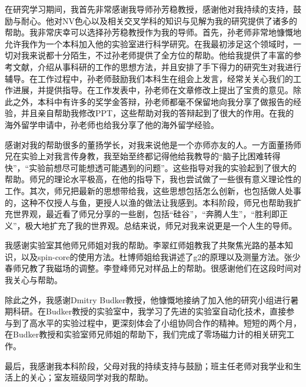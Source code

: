 
\begin{acknowledgements}

在研究学习期间，我首先非常感谢我导师孙芳稳教授，感谢他对我持续的支持，鼓励与耐心。他对NV色心以及相关交叉学科的知识与见解为我的研究提供了诸多的帮助。我非常庆幸可以选择孙芳稳教授作为我的导师。首先，孙老师非常地慷慨地允许我作为一个本科加入他的实验室进行科学研究。在我最初涉足这个领域时，一切对我来说都十分陌生，不过孙老师提供了全方位的帮助。他给我提供了丰富的参考文献，介绍从事科研的工作的思想方法，并且安排了手下得力的研究生对我进行辅导。在工作过程中，孙老师鼓励我们本科生在组会上发言，经常关关心我们的工作进展，并提供指导。在工作发表中，孙老师在文章修改上提出了宝贵的意见。除此之外，本科中有许多的奖学金答辩，孙老师都毫不保留地向我分享了做报告的经验，并且亲自帮助我修改PPT，这些帮助对我的答辩起到了很大的作用。在我的海外留学申请中，孙老师也给我分享了他的海外留学经验。

感谢对我的帮助很多的董扬学长，对我来说他是一个亦师亦友的人。一方面董扬师兄在实验上对我言传身教，我至始至终都记得他给我教导的“脑子比困难转得快”，“实验前想尽可能想透可能遇到的问题”。这些指导对我的实验起到了很大的帮助。师兄的理论水平极高，在他的指导下，我也尝试做了一些很有意义理论性的工作。其次，师兄把最新的思想带给我，这些思想包括怎么创新，也包括做人处事的，这种不仅授人与鱼，更授人以渔的做法让我感到。本科阶段，师兄也帮助我扩充世界观，最近看了师兄分享的一些剧，包括“硅谷”，“奔腾人生”，“胜利即正义”，极大地扩充了我的世界观。总结来说，师兄对我来说更是一个人生的导师。

我感谢实验室其他师兄师姐对我的帮助。李翠红师姐教我了共聚焦光路的基本知识，以及spin-core的使用方法。杜博师姐给我讲述了g2的原理以及测量方法。张少春师兄教了我磁场的调整。李登峰师兄对样品上的帮助。很感谢他们在这段时间对我关心与帮助。

除此之外，我感谢Dmitry Budker教授，他慷慨地接纳了加入他的研究小组进行暑期科研。在Budker教授的实验室中，我学习了先进的实验室自动化技术，直接参与到了高水平的实验过程中，更深刻体会了小组协同合作的精神。短短的两个月，在Budker教授和实验室师兄师姐的帮助下，我们完成了零场磁力计的相关研究工作。

最后，我感谢我本科阶段，父母对我的持续支持与鼓励；班主任老师对我学业和生活上的关心；室友班级同学对我的帮助。


\end{acknowledgements}
